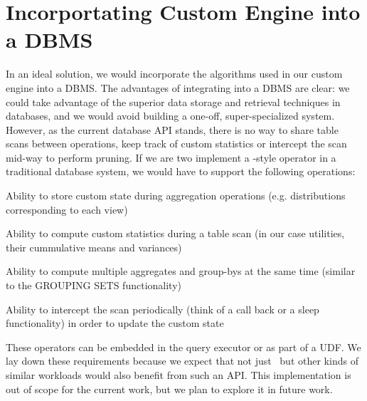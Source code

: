 \section{Incorportating Custom Engine into a DBMS}
\label{sec:incorporating}

In an ideal solution, we would incorporate the algorithms used in our custom
engine into a DBMS. 
The advantages of integrating into a DBMS are clear: we could take advantage of
the superior data storage and retrieval techniques in databases, and we would
avoid building a one-off, super-specialized system.
However, as the current database API stands, there is no way to share table
scans between operations, keep track of custom statistics or intercept the scan
mid-way to perform pruning.
If we are two implement a \VizRecDB-style operator in a traditional database
system, we would have to support the following operations:
\squishlist
\item Ability to store custom state during aggregation operations (e.g.
distributions corresponding to each view)
\item Ability to compute custom statistics during a table scan (in our case
utilities, their cummulative means and variances)
\item Ability to compute multiple aggregates and group-bys at the same time
(similar to the GROUPING SETS functionality)
\item Ability to intercept the scan periodically (think of a call back or a
sleep functionality) in order to update the custom state
\squishend

These operators can be embedded in the query executor or as part of a UDF.
We lay down these requirements because we expect that not just \VizRecDB\ but
other kinds of similar workloads would also benefit from such an API.
This implementation is out of scope for the current work, but we plan to explore
it in future work.